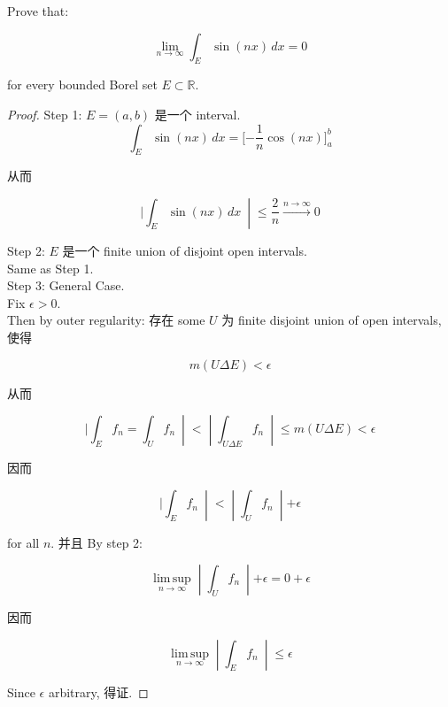\documentclass{qlnotes-export}
\begin{document}
\begin{example}\label{ex-lec36-problem-solving-example-003}

Prove that:

\[\lim\limits_{n\rightarrow\infty}\int_{E}\sin(nx)\, dx = 0\]

for every bounded Borel set \(E \subset {\mathbb{R}}\).\\

\end{example}

\begin{proof}

Step 1: \(E = (a,b)\) 是一个 interval.\\

\[\int_{E}\sin(nx)\, dx = \lbrack - \frac{1}{n}\cos(nx)\rbrack_{a}^{b}\]

从而

\[\left. |\int_{E}\sin(nx)\, dx\  \middle| \leq \frac{2}{n}\overset{n\rightarrow\infty}{\rightarrow}0 \right.\]

Step 2: \(E\) 是一个 finite union of disjoint open intervals.\\
Same as Step 1.\\
Step 3: General Case.\\
Fix \(\epsilon > 0\).\\
Then by outer regularity: 存在 some \(U\) 为 finite disjoint union of open intervals, 使得

\[m(U\Delta E) < \epsilon\]

从而

\[\left. |\int_{E}f_{n} = \int_{U}f_{n}\  \middle| < \middle| \int_{U\Delta E}f_{n}\  \middle| \leq m(U\Delta E) < \epsilon \right.\]

因而

\[\left. |\int_{E}f_{n}\  \middle| < \middle| \int_{U}f_{n}\  \middle| + \epsilon \right.\]

for all \(n\). 并且 By step 2:

\[\left. \operatorname{lim\, sup}\limits_{n\rightarrow\infty} \middle| \int_{U}f_{n}\  \middle| + \epsilon = 0 + \epsilon \right.\]

因而

\[\left. \operatorname{lim\, sup}\limits_{n\rightarrow\infty} \middle| \int_{E}f_{n}\  \middle| \leq \epsilon \right.\]

Since \(\epsilon\) arbitrary, 得证.

\end{proof}
\end{document}
